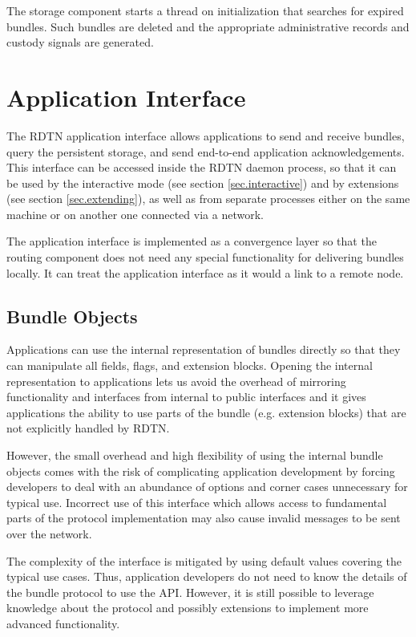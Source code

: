 \documentclass[a4paper]{article}
\begin{document}
The storage component starts a thread on initialization that searches
for expired bundles. Such bundles are deleted and the appropriate administrative
records and custody signals are generated.

\section{Application Interface}\label{sec.appif}

The RDTN application interface allows applications to send and receive bundles,
query the persistent storage, and send end-to-end application acknowledgements.
This interface can be accessed inside the RDTN daemon process, so that it can be
used by the interactive mode (see section \ref{sec.interactive}) and by
extensions (see section \ref{sec.extending}), as well as from separate processes
either on the same machine or on another one connected via a network.

The application interface is implemented as a convergence layer so that the
routing component does not need any special functionality for delivering bundles
locally. It can treat the application interface as it would a link to a remote
node.

\subsection{Bundle Objects}\label{sec.bundle-obj}

Applications can use the internal representation of bundles directly so that
they can manipulate all fields, flags, and extension blocks. Opening the
internal representation to applications lets us avoid the overhead of mirroring
functionality and interfaces from internal to public interfaces and it gives
applications the ability to use parts of the bundle (e.g. extension blocks) that
are not explicitly handled by RDTN.

However, the small overhead and high flexibility of using the internal bundle
objects comes with the risk of complicating application development by forcing
developers to deal with an abundance of options and corner cases unnecessary for
typical use. Incorrect use of this interface which allows access to
fundamental parts of the protocol implementation may also cause invalid messages
to be sent over the network.

The complexity of the interface is mitigated by using default values covering the
typical use cases. Thus, application developers do not need to know the details
of the bundle protocol to use the API. However, it is still possible to leverage
knowledge about the protocol and possibly extensions to implement more advanced
functionality.
\end{document}
